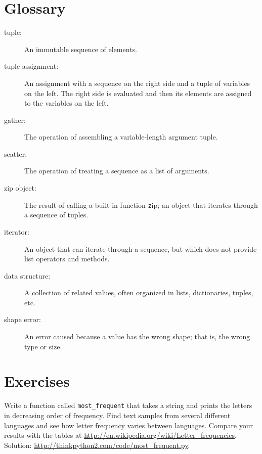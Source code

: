 \documentclass[
DIV=11,
fontsize=12,
twoside,
headinclude=false,
titlepage=firstiscover,
abstract=true,
headsepline=true,
footsepline=true,
chapterprefix=true, %
headings=big,
bibliography=totoc,%
captions=tableheading
]{scrbook}
\theoremstyle{definition}
\begin{document}
\section{Glossary}

\begin{description}

\item[tuple:] An immutable sequence of elements.

\item[tuple assignment:] An assignment with a sequence on the
right side and a tuple of variables on the left.  The right
side is evaluated and then its elements are assigned to the
variables on the left.

\item[gather:] The operation of assembling a variable-length
argument tuple.

\item[scatter:] The operation of treating a sequence as a list of
arguments.

\item[zip object:] The result of calling a built-in function {\texttt zip};
an object that iterates through a sequence of tuples.

\item[iterator:] An object that can iterate through a sequence, but
which does not provide list operators and methods.

\item[data structure:] A collection of related values, often
organized in lists, dictionaries, tuples, etc.

\item[shape error:] An error caused because a value has the
wrong shape; that is, the wrong type or size.

\end{description}


\section{Exercises}

\begin{exercise}
\normalfont

Write a function called \verb"most_frequent" that takes a string and
prints the letters in decreasing order of frequency.  Find text
samples from several different languages and see how letter frequency
varies between languages.  Compare your results with the tables at
\url{http://en.wikipedia.org/wiki/Letter_frequencies}.  Solution:
\url{http://thinkpython2.com/code/most_frequent.py}.   

\end{exercise}
\end{document}
